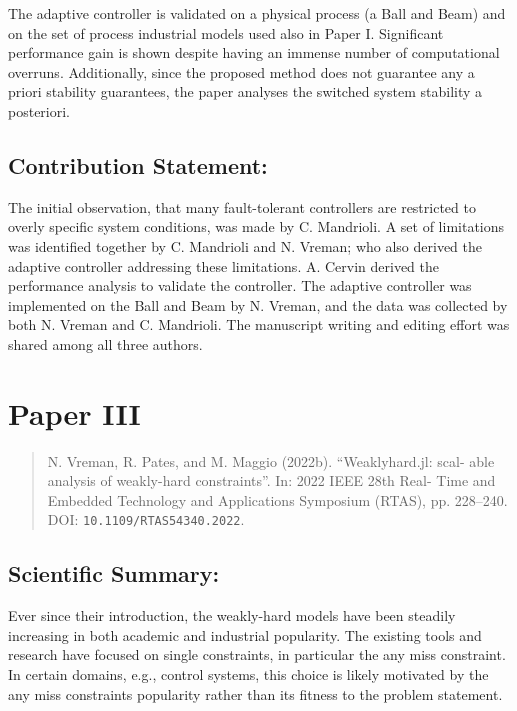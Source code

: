 \documentclass{article}
\begin{document}
The adaptive controller is validated on a physical process (a Ball and Beam) and on the set of process industrial models used also in Paper I.
Significant performance gain is shown despite having an immense number of computational overruns.
Additionally, since the proposed method does not guarantee any a priori stability guarantees, the paper analyses the switched system stability a posteriori.

\subsection*{Contribution Statement:}%
%
The initial observation, that many fault-tolerant controllers are restricted to overly specific system conditions, was made by C. Mandrioli.
A set of limitations was identified together by C. Mandrioli and N. Vreman; who also derived the adaptive controller addressing these limitations.
A. Cervin derived the performance analysis to validate the controller.
The adaptive controller was implemented on the Ball and Beam by N. Vreman, and the data was collected by both N. Vreman and C. Mandrioli.
The manuscript writing and editing effort was shared among all three authors.


\section*{Paper III}%
%
\begin{quote}
N. Vreman, R. Pates, and M. Maggio (2022b). ``Weaklyhard.jl: scal- able analysis of weakly-hard constraints''. In: 2022 IEEE 28th Real- Time and Embedded Technology and Applications Symposium (RTAS), pp. 228–240. DOI: \texttt{10.1109/RTAS54340.2022}.
\end{quote}

\subsection*{Scientific Summary:}%
%
Ever since their introduction, the weakly-hard models have been steadily increasing in both academic and industrial popularity.
The existing tools and research have focused on single constraints, in particular the any miss constraint.
In certain domains, e.g., control systems, this choice is likely motivated by the any miss constraints popularity rather than its fitness to the problem statement.
\end{document}
